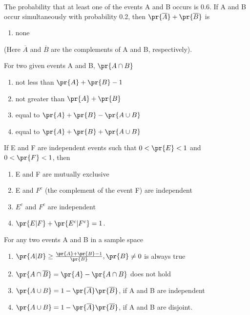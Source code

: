 \iffalse 
\title{ASSIGNMENT 3}
\author{Akshara Sarma Chennubhatla}
\section{mcq-multiple}
\fi
\item The probability that at least one of the events A and B occurs is 0.6. If A and B occur simultaneously with probability 0.2, then $\pr{\overline{A}}+\pr{\overline{B}}$ is
\hfill{}
\begin{enumerate}
\item none
\end{enumerate}
(Here $\overline{A}$ and $\overline{B}$ are the complements of A and B, respectively).
\item For two given events A and B, $\pr{A \cap B}$
\hfill{}
\begin{enumerate}
\item not less than $\pr{A}+\pr{B}-1$
\item not greater than $\pr{A}+\pr{B}$
\item equal to $\pr{A}+\pr{B}-\pr{A \cup B}$
\item equal to $\pr{A}+\pr{B}+\pr{A \cup B}$
\end{enumerate}
\item If E and F are independent events such that $0<\pr{E}<1$ and $0<\pr{F}<1$, then 
\hfill{}
\begin{enumerate}
\item E and F are mutually exclusive
\item E and $F^c$ (the complement of the event F) are independent
\item $E^c$ and $F^c$ are independent
\item $\pr{E|F}+\pr{E^c|F^c}=1$.
\end{enumerate}
\item For any two events A and B in a sample space
\hfill{}
\begin{enumerate}
\item $\pr{A|B}\geq \frac{\pr{A}+\pr{B}-1}{\pr{B}}, \pr{B}\neq 0$ is always true
\item $\pr{A\cap \overline{B}}=\pr{A}-\pr{A\cap B}$ does not hold
\item $\pr{A\cup B}=1-\pr{\overline{A}}\pr{\overline{B}}$, if A and B are independent
\item $\pr{A\cup B}=1-\pr{\overline{A}}\pr{\overline{B}}$, if A and B are disjoint.
\end{enumerate}
